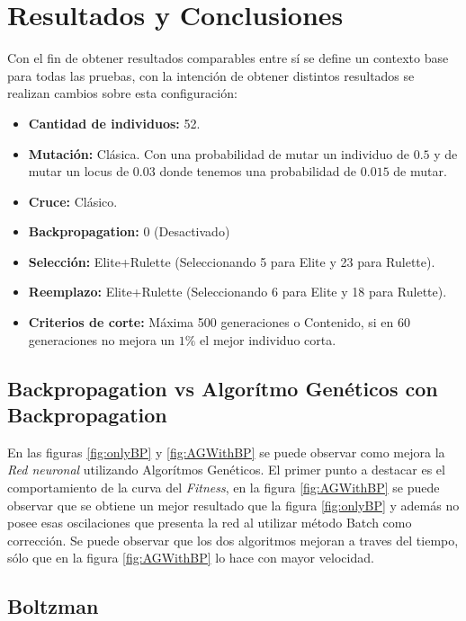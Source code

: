 \documentclass{sig-alternate}
\begin{document}
	\section{Resultados y Conclusiones}

		Con el fin de obtener resultados comparables entre sí se define un
		contexto base para todas las pruebas, con la intención de obtener distintos 
		resultados se realizan cambios sobre esta configuración:

		\begin{itemize}
			\item \textbf{Cantidad de individuos:} 52.
			\item \textbf{Mutación:} Clásica. Con una probabilidad de mutar un individuo de $0.5$ 
			y de mutar un locus de $0.03$ donde tenemos una probabilidad de $0.015$ de mutar.
			\item \textbf{Cruce:} Clásico.
			\item \textbf{Backpropagation:} 0 (Desactivado)
			\item \textbf{Selección:} Elite+Rulette (Seleccionando 5 para Elite y 23 para Rulette).
			\item \textbf{Reemplazo:} Elite+Rulette (Seleccionando 6 para Elite y 18 para Rulette).
			\item \textbf{Criterios de corte:} Máxima 500 generaciones o Contenido, si en 60 generaciones
			no mejora un $1\%$ el mejor individuo corta.
		\end{itemize}

		\subsection{Backpropagation vs Algorítmo Genéticos con Backpropagation}


		En las figuras \ref{fig:onlyBP} y \ref{fig:AGWithBP} se puede observar como mejora la \textit{Red neuronal} utilizando Algorítmos Genéticos. El primer punto a destacar es el comportamiento de la curva del \textit{Fitness}, en la figura \ref{fig:AGWithBP} se puede observar que se obtiene un mejor resultado que la figura \ref{fig:onlyBP} y además no posee esas oscilaciones que presenta la red al utilizar método Batch como corrección. Se puede observar que los dos algoritmos mejoran a traves del tiempo, sólo que en la figura \ref{fig:AGWithBP} lo hace con mayor velocidad.
		
		\subsection{Boltzman}
\end{document}

